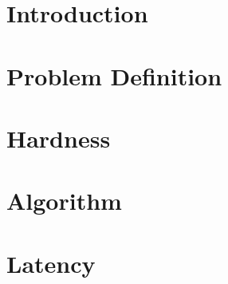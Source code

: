 \begin{abstract}

\end{abstract}

\section{Introduction}


\section{Problem Definition}


\section{Hardness}


\newpage
\section{Algorithm}


\section{Latency}

